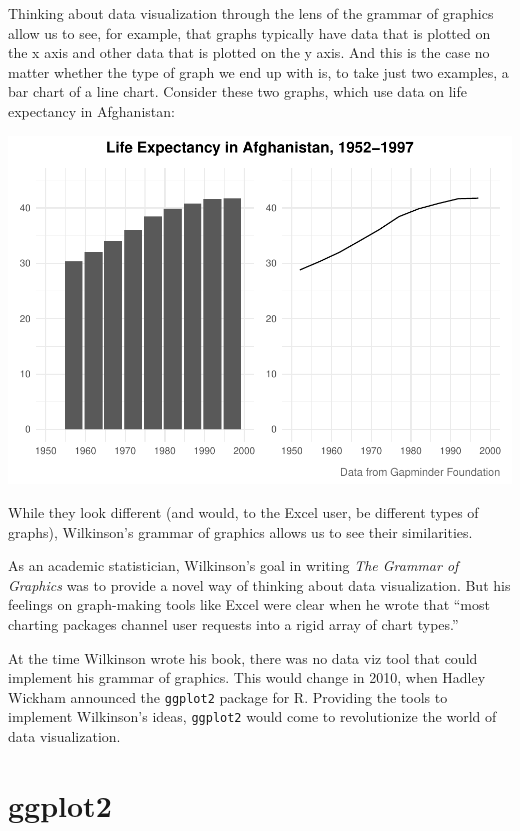 \documentclass[
]{book}
\begin{document}
Thinking about data visualization through the lens of the grammar of graphics allow us to see, for example, that graphs typically have data that is plotted on the x axis and other data that is plotted on the y axis. And this is the case no matter whether the type of graph we end up with is, to take just two examples, a bar chart of a line chart. Consider these two graphs, which use data on life expectancy in Afghanistan:

\includegraphics[width=1\linewidth]{data-viz_files/figure-latex/unnamed-chunk-7-1}

While they look different (and would, to the Excel user, be different types of graphs), Wilkinson's grammar of graphics allows us to see their similarities.

As an academic statistician, Wilkinson's goal in writing \emph{The Grammar of Graphics} was to provide a novel way of thinking about data visualization. But his feelings on graph-making tools like Excel were clear when he wrote that ``most charting packages channel user requests into a rigid array of chart types.''

At the time Wilkinson wrote his book, there was no data viz tool that could implement his grammar of graphics. This would change in 2010, when Hadley Wickham announced the \texttt{ggplot2} package for R. Providing the tools to implement Wilkinson's ideas, \texttt{ggplot2} would come to revolutionize the world of data visualization.

\hypertarget{ggplot2}{%
\section{ggplot2}\label{ggplot2}}
\end{document}
